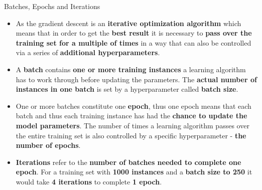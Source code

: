 \documentclass[document.tex]{subfiles}
\begin{document}
    \begin{frame}{Batches, Epochs and Iterations}
        \begin{itemize}
            \item As the gradient descent is an \textbf{iterative optimization algorithm} which means that in order to get the \textbf{best result} it is necessary to \textbf{pass over the training set for a multiple  of times} in a way that can also be controlled via a series of \textbf{additional hyperparameters}.
            \item A \textbf{batch} contains \textbf{one or more training instances} a learning algorithm has to work through before updating the parameters. The \textbf{actual number of instances in one batch} is set by a hyperparameter called \textbf{batch size}.
            \item One or more batches constitute one \textbf{epoch}, thus one epoch means that each batch and thus each training instance has had the \textbf{chance to update the model parameters}. The number of times a learning algorithm passes over the entire training set is also controlled by a specific hyperparameter - \textbf{the number of epochs}.
            \item \textbf{Iterations} refer to the \textbf{number of batches needed to complete one epoch}. For a training set with \textbf{1000 instances} and a \textbf{batch size to 250} it would take \textbf{4 iterations} to complete \textbf{1 epoch}.
        \end{itemize}
    \end{frame}
\end{document}
